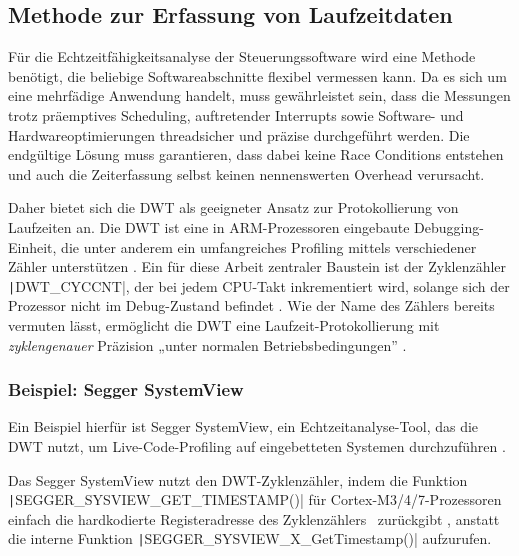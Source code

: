 \subsection{Methode zur Erfassung von Laufzeitdaten} \label{sec:dwt}

Für die Echtzeitfähigkeitsanalyse der Steuerungssoftware wird eine Methode
benötigt, die beliebige Softwareabschnitte flexibel vermessen kann. Da es sich
um eine mehrfädige Anwendung handelt, muss gewährleistet sein, dass die
Messungen trotz präemptives Scheduling, auftretender Interrupts sowie Software-
und Hardwareoptimierungen threadsicher und präzise durchgeführt werden. Die
endgültige Lösung muss garantieren, dass dabei keine Race Conditions entstehen
und auch die Zeiterfassung selbst keinen nennenswerten Overhead verursacht.

Daher bietet sich die \ac{DWT} als geeigneter Ansatz zur Protokollierung von
Laufzeiten an. Die DWT ist eine in ARM-Prozessoren eingebaute Debugging-Einheit,
die unter anderem ein umfangreiches Profiling mittels verschiedener Zähler
unterstützen \cite{ARMv7_ref_man_dwt_profiling}. Ein für diese Arbeit zentraler
Baustein ist der Zyklenzähler \texttt|DWT_CYCCNT|, der bei jedem CPU-Takt
inkrementiert wird, solange sich der Prozessor nicht im Debug-Zustand befindet
\cite{ARMv7_ref_man_dwt_cycle}. Wie der Name des Zählers bereits vermuten lässt,
ermöglicht die DWT eine Laufzeit-Protokollierung mit \textit{zyklengenauer}
Präzision „unter normalen Betriebsbedingungen”
\cite{ARMv7_ref_man_dwt_profiling}.

\subsubsection{Beispiel: Segger SystemView}

Ein Beispiel hierfür ist Segger SystemView, ein Echtzeitanalyse-Tool, das die
DWT nutzt, um Live-Code-Profiling auf eingebetteten Systemen durchzuführen
\cite{SEGGER_SystemView}.

Das Segger SystemView nutzt den DWT-Zyklenzähler, indem die Funktion \linebreak
\texttt|SEGGER_SYSVIEW_GET_TIMESTAMP()| für Cortex-M3/4/7-Prozessoren
einfach die hardkodierte Registeradresse des
Zyklenzählers~\cite{Arm_DWT_Programmers_Model} zurückgibt \cite[S.
65]{Segger_SystemView_manual}, anstatt die interne Funktion
\texttt|SEGGER_SYSVIEW_X_GetTimestamp()| aufzurufen.
